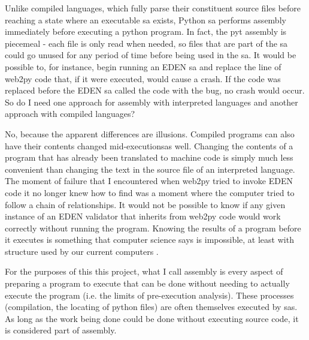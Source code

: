 \documentclass[a4paper,man,natbib,floatsintext]{apa6}
\begin{document}
   Unlike compiled languages, which fully parse their constituent source files before reaching a state where an executable \gls{sa} exists, Python \gls{sa} performs assembly immediately before executing a python program. In fact, the \gls{pyt} assembly is piecemeal - each file is only read when needed, so files that are part of the \gls{sa} could go unused for any period of time before being used in the \gls{sa}. It would be possible to, for instance, begin running an \gls{EDEN} \gls{sa} and replace the line of web2py code that, if it were executed, would cause a crash. If the code was replaced before the \gls{EDEN} \gls{sa} called the code with the bug, no crash would occur. So do I need one approach for assembly with interpreted languages and another approach with compiled languages?

   No, because the apparent differences are illusions. Compiled programs can also have their contents changed mid-executions\footnotemark as well. Changing the contents of a program that has already been translated to machine code is simply much less convenient than changing the text in the source file of an interpreted language. The moment of failure that I encountered when web2py tried to invoke \gls{EDEN} code it no longer knew how to find was a moment where the computer tried to follow a chain of relationships. It would not be possible to know if any given instance of an \gls{EDEN} validator that inherits from web2py code would work correctly without running the program. Knowing the results of a program before it executes is something that computer science says is impossible, at least with structure used by our current computers \citep{Kaplan_undated-xy}. 


   For the purposes of this this project, what I call assembly is every aspect of preparing a program to execute that can be done without needing to actually execute the program (i.e. the limits of pre-execution analysis). These processes (compilation, the locating of python files) are often themselves executed by \glspl{sa}. As long as the work being done could be done without executing source code, it is considered part of assembly. 
\end{document}
